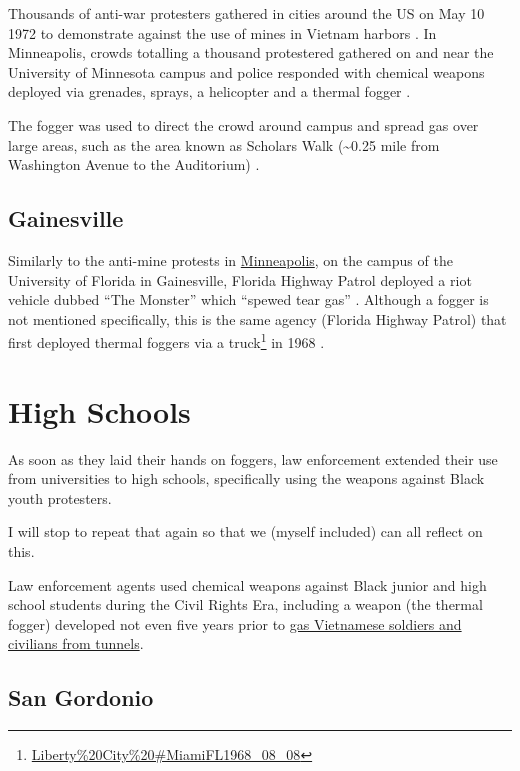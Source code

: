 \documentclass[
  11pt,
  titlepage]{krantz}
\renewcommand{\href}[2]{#2\footnote{\url{#1}}}
\begin{document}
Thousands of anti-war protesters gathered in cities around the US on May 10 1972 to demonstrate against the use of mines in Vietnam harbors \citep{ArgusLeader1972_05_11a}.
In Minneapolis, crowds totalling a thousand protestered gathered on and near the University of Minnesota campus and police responded with chemical weapons deployed via grenades, sprays, a helicopter and a thermal fogger \citep{ArgusLeader1972_05_11b, StarTribune1972_05_11}.

The fogger was used to direct the crowd around campus and spread gas over large areas, such as the area known as Scholars Walk (\textasciitilde0.25 mile from Washington Avenue to the Auditorium) \citep{StarTribune1972_05_11}.

\hypertarget{gainesville}{%
\subsection*{Gainesville}\label{gainesville}}


Similarly to the anti-mine protests in \protect\hyperlink{Minneapolis1972_05_10}{Minneapolis}, on the campus of the University of Florida in Gainesville, Florida Highway Patrol deployed a riot vehicle dubbed ``The Monster'' which ``spewed tear gas'' \citep{ArgusLeader1972_05_11b}.
Although a fogger is not mentioned specifically, this is the same agency (Florida Highway Patrol) that first \href{Liberty\%20City\%20\#MiamiFL1968_08_08}{deployed thermal foggers via a truck} in 1968 \citep{Tschenschlok1995, Lorentzen2018}.

\hypertarget{high-schools}{%
\section*{High Schools}\label{high-schools}}


As soon as they laid their hands on foggers, law enforcement extended their use from \protect\hypertarget{Universities}{}{universities} to high schools, specifically using the weapons against Black youth protesters.

I will stop to repeat that again so that we (myself included) can all reflect on this.

Law enforcement agents used chemical weapons against Black junior and high school students during the Civil Rights Era, including a weapon (the thermal fogger) developed not even five years prior to \protect\hyperlink{Vietnam}{gas Vietnamese soldiers and civilians from tunnels}.

\hypertarget{SanGordonio}{%
\subsection*{San Gordonio}\label{SanGordonio}}
\end{document}
